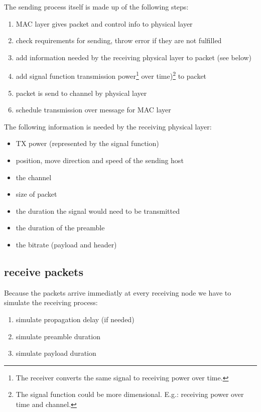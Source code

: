 The sending process itself is made up of the following steps:

\begin{enumerate}
 \item MAC layer gives packet and control info to physical layer
 \item check requirements for sending, throw error if they are not fulfilled
 \item add information needed by the receiving physical layer to packet (see below)
 \item add signal function transmission power\footnote{The receiver converts the same signal to receiving power over time.} over time)\footnote{The signal function could be more dimensional. E.g.: receiving power over time and channel.} to packet
 \item packet is send to channel by physical layer
 \item schedule transmission over message for MAC layer
\end{enumerate}

The following information is needed by the receiving physical layer:

\begin{itemize}
\item TX power (represented by the signal function)
\item position, move direction and speed of the sending host
\item the channel
\item size of packet
\item the duration the signal would need to be transmitted
\item the duration of the preamble
\item the bitrate (payload and header)
\end{itemize}

\subsection{receive packets}

Because the packets arrive immediatly at every receiving node we have to simulate the receiving process:

\begin{enumerate}
\item simulate propagation delay (if needed)
\item simulate preamble duration
\item simulate payload duration
\end{enumerate}

